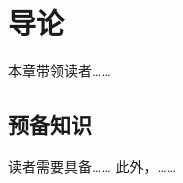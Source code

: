 \documentclass[10pt,adobefonts,fancyhdr,UTF8]{ctexbook}
\begin{document}
\pagestyle{fancy}
\fancyhf{}
\fancyhead[RE]{\normalfont\small\rmfamily\nouppercase{\leftmark}}
\fancyhead[LO]{\normalfont\small\rmfamily\nouppercase{\rightmark}}
\fancyhead[LE,RO]{\thepage}
\mainmatter
\chapter{导论}
本章带领读者……
\newpage
\section{预备知识}
读者需要具备……
\newpage
此外，……
\end{document}
